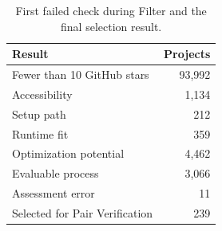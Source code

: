 \begin{table}[H]
  \centering
  \small
  \setlength{\tabcolsep}{10pt}
  \renewcommand{\arraystretch}{1.15}
  \caption{First failed check during Filter and the final selection result.}
  \label{tab:perfrace-filter-statistics}
  \begin{tabular}{@{}lr@{}}
    \toprule
    Result & Projects \\
    \midrule
    Fewer than 10 GitHub stars & 93,992 \\
    Accessibility & 1,134 \\
    Setup path & 212 \\
    Runtime fit & 359 \\
    Optimization potential & 4,462 \\
    Evaluable process & 3,066 \\
    Assessment error & 11 \\
    \midrule
    Selected for Pair Verification & 239 \\
    \bottomrule
  \end{tabular}
\end{table}
